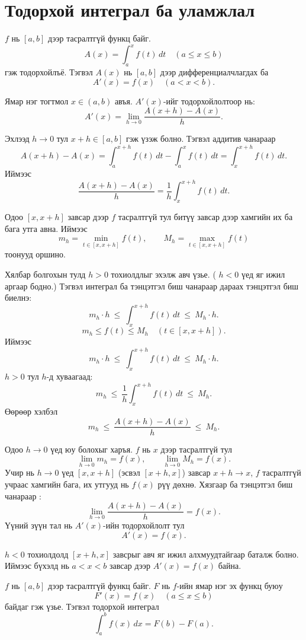 \section{Тодорхой интеграл ба уламжлал}
\begin{theorem}
$f$ нь $[a,b]$ дээр тасралтгүй функц байг. 
\[
A(x)=\int_a^x f(t)\,dt \quad (a\le x\le b)
\]
гэж тодорхойлъё. Тэгвэл $A(x)$ нь $[a,b]$ дээр дифференциалчлагдах ба
\[
A'(x)=f(x)\quad (a<x<b).
\]
\end{theorem}

\begin{prof}
Ямар нэг тогтмол $x\in(a,b)$ авъя. $A'(x)$-ийг тодорхойлолтоор нь:
\[
A'(x)=\lim_{h\to0}\frac{A(x+h)-A(x)}{h}.
\]

Эхлээд $h\to 0$ тул $x+h\in[a,b]$ гэж үзэж болно. Тэгвэл аддитив чанараар
\[
A(x+h)-A(x)
= \int_a^{x+h} f(t)\,dt - \int_a^x f(t)\,dt
= \int_x^{x+h} f(t)\,dt.
\]
Иймээс
\[
\frac{A(x+h)-A(x)}{h}
=
\frac{1}{h}\int_x^{x+h} f(t)\,dt.
\]

Одоо $[x,x+h]$ завсар дээр $f$ тасралтгүй тул битүү завсар дээр хамгийн их ба бага утга авна. Иймээс
\[
m_h=\min_{t\in[x,x+h]} f(t),\qquad M_h=\max_{t\in[x,x+h]} f(t)
\]
тоонууд оршино.

Хялбар болгохын тулд $h>0$ тохиолдлыг эхэлж авч үзье. ( $h<0$ үед яг ижил аргаар бодно.) Тэгвэл интеграл ба тэнцэтгэл биш чанараар дараах тэнцэтгэл биш биелнэ:
\[
m_h\cdot h
\ \le\
\int_x^{x+h} f(t)\,dt
\ \le\
M_h\cdot h.
\]
\[
m_h \le f(t)\le M_h \quad (t\in[x,x+h]).
\]
Иймээс
\[
m_h\cdot h
\ \le\
\int_x^{x+h} f(t)\,dt
\ \le\
M_h\cdot h.
\]
$h>0$ тул $h$-д хуваагаад:
\[
m_h
\ \le\
\frac{1}{h}\int_x^{x+h} f(t)\,dt
\ \le\
M_h.
\]
Өөрөөр хэлбэл
\[
m_h
\ \le\
\frac{A(x+h)-A(x)}{h}
\ \le\
M_h.
\]

Одоо $h\to0$ үед юу болохыг харъя. $f$ нь $x$ дээр тасралтгүй тул
\[
\lim_{h\to0} m_h = f(x),\qquad \lim_{h\to0} M_h = f(x).
\]
Учир нь $h\to0$ үед $[x,x+h]$ (эсвэл $[x+h,x]$) завсар $x+h\to x$,   $f$ тасралтгүй учраас хамгийн бага, их утгууд нь $f(x)$ рүү дөхнө.
Хязгаар ба тэнцэтгэл биш чанараар :
\[
\lim_{h\to0}\frac{A(x+h)-A(x)}{h} = f(x).
\]
Үүний зүүн тал нь $A'(x)$-ийн тодорхойлолт тул
\[
A'(x)=f(x).
\]

$h<0$ тохиолдолд $[x+h,x]$ завсрыг авч яг ижил алхмуудтайгаар баталж болно. Иймээс бүхэлд нь $a<x<b$ завсар дээр $A'(x)=f(x)$ байна.
\end{prof}
\begin{theorem}\label{N-L formula}
$f$ нь $[a,b]$ дээр тасралтгүй функц байг. $F$ нь $f$-ийн ямар нэг эх функц буюу
\[
F'(x)=f(x)
\quad(a\le x\le b)
\]
байдаг гэж үзье. Тэгвэл тодорхой интеграл
\[
\int_a^b f(x)\,dx = F(b)-F(a).
\]
\end{theorem}

